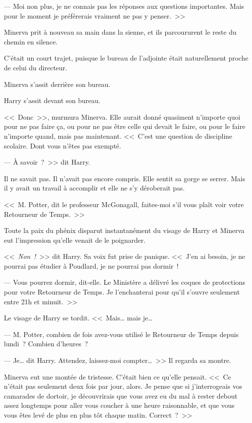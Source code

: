 --- Moi non plus, je ne connais pas les réponses aux questions importantes. Mais pour le moment je préférerais vraiment ne pas y penser.~>>

Minerva prit à nouveau sa main dans la sienne, et ils parcoururent le reste du chemin en silence.

C'était un court trajet, puisque le bureau de l'adjointe était naturellement proche de celui du directeur.

Minerva s'assit derrière son bureau.

Harry s'assit devant son bureau.

<<~Donc~>>, murmura Minerva. Elle aurait donné quasiment n'importe quoi pour ne pas faire ça, ou pour ne pas être celle qui devait le faire, ou pour le faire n'importe quand, mais pas maintenant. <<~C'est une question de discipline scolaire. Dont vous n'êtes pas exempté.

--- À savoir~?~>> dit Harry.

Il ne savait pas. Il n'avait pas encore compris. Elle sentit sa gorge se serrer. Mais il y avait un travail à accomplir et elle ne s'y déroberait pas.

<<~M. Potter, dit le professeur McGonagall, faites-moi s'il vous plaît voir votre Retourneur de Temps.~>>

Toute la paix du phénix disparut instantanément du visage de Harry et Minerva eut l'impression qu'elle venait de le poignarder.

<<~\emph{Non~!}~>> dit Harry. Sa voix fut prise de panique. <<~J'en ai besoin, je ne pourrai pas étudier à Poudlard, je ne pourrai pas dormir~!

--- Vous pourrez dormir, dit-elle. Le Ministère a délivré les coques de protections pour votre Retourneur de Temps. Je l'enchanterai pour qu'il s'ouvre seulement entre 21h et minuit.~>>

Le visage de Harry se tordit. <<~Mais… mais je…

--- M. Potter, combien de fois avez-vous utilisé le Retourneur de Temps depuis lundi~? Combien d'heures~?

--- Je… dit Harry. Attendez, laissez-moi compter…~>> Il regarda sa montre.

Minerva eut une montée de tristesse. C'était bien ce qu'elle pensait. <<~Ce n'était pas seulement deux fois par jour, alors. Je pense que si j'interrogeais vos camarades de dortoir, je découvrirais que vous avez eu du mal à rester debout assez longtemps pour aller vous coucher à une heure raisonnable, et que vous vous êtes levé de plus en plus tôt chaque matin. Correct~?~>>

